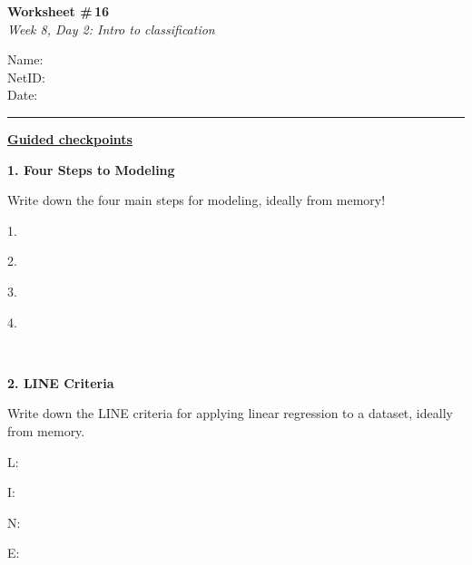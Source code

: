 \documentclass[11pt]{article}
\newcommand{\blankspace}[1]{%
  \vspace{0.3em}
  \begin{minipage}[t][#1][t]{\linewidth}
  \end{minipage}
  \vspace{0.3em}
}
\newcommand{\guidedopen}[4]{%
  \noindent\textbf{#1}\\[0.18em]
  \noindent
  \begin{minipage}[t]{0.485\textwidth}
    #2
    \blankspace{#3}
  \end{minipage}
  \hfill
  \begin{minipage}[t]{0.485\textwidth}
    \blankspace{#4}
  \end{minipage}
  \\[0.4em]
}
\begin{document}
\RaggedRight

\noindent
\begin{minipage}[t]{0.55\textwidth}
  \vspace{0pt}
  {\LARGE \textbf{Worksheet \#\,16}} \\[0.18em]
  {\large \textit{Week 8, Day 2: Intro to classification}}
\end{minipage}
\hfill
\begin{minipage}[t]{0.40\textwidth}
  \vspace{0pt}
  \small
  Name: \underline{\hspace{4.5cm}} \\[0.35em]
  NetID: \underline{\hspace{4.3cm}} \\[0.35em]
  Date: \underline{\hspace{4.4cm}} \\
\end{minipage}

\vspace{0.6em}
\noindent\rule{\linewidth}{0.6pt}
\vspace{0.1em}

\noindent\underline{\textbf{Guided checkpoints}}\\[0.2em]
\vspace{0.8em}

\guidedopen{1. Four Steps to Modeling}{
Write down the four main steps for modeling, ideally from memory!

\vspace{0.5em}
1.
\vspace{0.7cm}

2.
\vspace{0.7cm}

3.
\vspace{0.7cm}

4.
}{0.7cm}{4.4cm}

\vfill

\guidedopen{2. LINE Criteria}{
Write down the LINE criteria for applying linear regression to a dataset, ideally from memory.

\vspace{0.5em}
L:
\vspace{0.7cm}

I:
\vspace{0.7cm}

N:
\vspace{0.7cm}

E:
}{0.7cm}{4.8cm}
\end{document}
